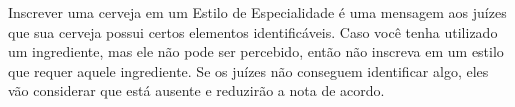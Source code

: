 Inscrever uma cerveja em um Estilo de Especialidade é uma mensagem aos juízes que sua cerveja possui certos elementos identificáveis. Caso você tenha utilizado um ingrediente, mas ele não pode ser percebido, então não inscreva em um estilo que requer aquele ingrediente. Se os juízes não conseguem identificar algo, eles vão considerar que está ausente e reduzirão a nota de acordo.
